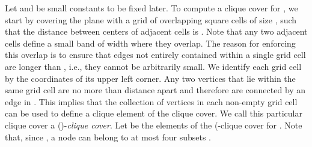 \documentclass{llncs}
\begin{document}
Let  and
 be small constants to be fixed later.
To compute a clique cover for , we
start by covering the plane with a grid of overlapping square cells of size
, such that the
distance between centers of adjacent cells is
. Note that any two adjacent
cells define a small band of width  where they overlap. The
reason for enforcing this overlap is to ensure that edges
not entirely contained within a single grid cell are longer
than , i.e., they cannot be arbitrarily small.
We identify each grid cell by the coordinates  of its upper left corner.
Any two vertices that lie within the same grid cell are no more than
 distance apart and therefore are connected by an edge in .
This implies that the collection of vertices in each non-empty grid
cell can be used to define a clique element of the clique cover.
We call this
particular clique cover a ()-\emph{clique cover}.
Let  be the elements of the (-clique cover for .
Note that, since , a node  can
belong to at most four subsets .
\end{document}

